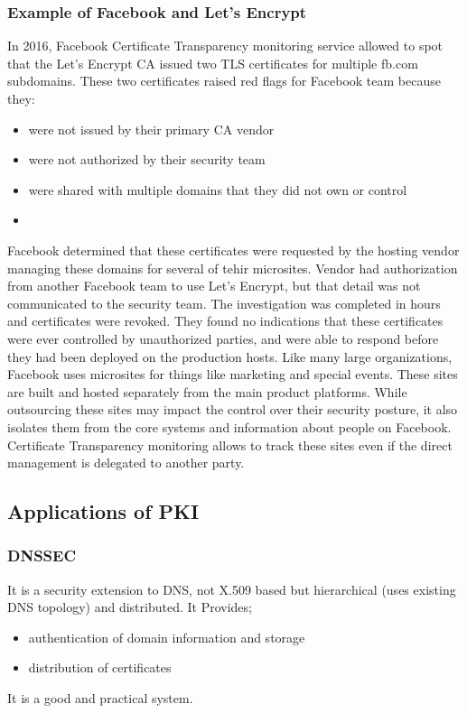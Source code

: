 \documentclass[a4paper, 10pt, titlepage]{article}
\begin{document}
\subsubsection*{Example of Facebook and Let's Encrypt}
In 2016, Facebook Certificate Transparency monitoring service allowed to spot that the Let's Encrypt CA issued two TLS certificates for multiple fb.com subdomains. These two certificates raised red flags for Facebook team because they:
\begin{itemize}
\item were not issued by their primary CA vendor
\item were not authorized by their security team
\item were shared with multiple domains that they did not own or control
\item 
\end{itemize}
Facebook determined that these certificates were requested by the hosting vendor managing these domains for several of tehir microsites. Vendor had authorization from another Facebook team to use Let's Encrypt, but that detail was not communicated to the security team. The investigation was completed in hours and certificates were revoked. They found no indications that these certificates were ever controlled by unauthorized parties, and were able to respond before they had been deployed on the production hosts.
Like many large organizations, Facebook uses microsites for things like marketing and special events. These sites are built and hosted separately from the main product platforms. While outsourcing these sites may impact the control over their security posture, it also isolates them from the core systems and information about people on Facebook. Certificate Transparency monitoring allows to track these sites even if the direct management is delegated to another party.

\subsection{Applications of PKI}
\subsubsection{DNSSEC}
It is a security extension to DNS, not X.509 based but hierarchical (uses existing DNS topology) and distributed. It Provides;
\begin{itemize}
\item authentication of domain information and storage
\item distribution of certificates
\end{itemize}
It is a good and practical system.
\end{document}
